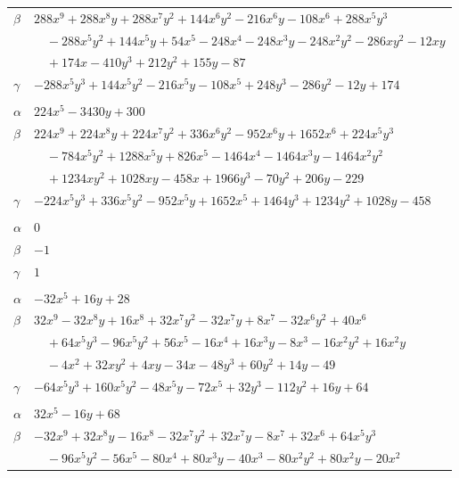 \documentclass[11pt]{article}
\begin{document}
\begin{longtable}{@{}ll@{}}
$\beta$ & $288x^{9}+288x^{8}y+288x^{7}y^{2}+144x^{6}y^{2}-216x^{6}y-108x^{6}+288x^{5}y^{3}$\\
 & $\quad -288x^{5}y^{2}+144x^{5}y+54x^{5}-248x^{4}-248x^{3}y-248x^{2}y^{2}-286xy^{2}-12xy$\\
 & $\quad +174x-410y^{3}+212y^{2}+155y-87$\\
$\gamma$ & $-288x^{5}y^{3}+144x^{5}y^{2}-216x^{5}y-108x^{5}+248y^{3}-286y^{2}-12y+174$\\
\addlinespace[3pt]
\multicolumn{2}{@{}l}{$\{i,j\}=\{8,34\}$, $k_{ij}=2^{3}\cdot 7\cdot 11$}\\
$\alpha$ & $224x^{5}-3430y+300$\\
$\beta$ & $224x^{9}+224x^{8}y+224x^{7}y^{2}+336x^{6}y^{2}-952x^{6}y+1652x^{6}+224x^{5}y^{3}$\\
 & $\quad -784x^{5}y^{2}+1288x^{5}y+826x^{5}-1464x^{4}-1464x^{3}y-1464x^{2}y^{2}$\\
 & $\quad +1234xy^{2}+1028xy-458x+1966y^{3}-70y^{2}+206y-229$\\
$\gamma$ & $-224x^{5}y^{3}+336x^{5}y^{2}-952x^{5}y+1652x^{5}+1464y^{3}+1234y^{2}+1028y-458$\\
\addlinespace[3pt]
\multicolumn{2}{@{}l}{$\{i,j\}=\{9,13\}$, $k_{ij}=3$}\\
$\alpha$ & $0$\\
$\beta$ & $-1$\\
$\gamma$ & $1$\\
\addlinespace[3pt]
\multicolumn{2}{@{}l}{$\{i,j\}=\{9,17\}$, $k_{ij}=3\cdot 7$}\\
$\alpha$ & $-32x^{5}+16y+28$\\
$\beta$ & $32x^{9}-32x^{8}y+16x^{8}+32x^{7}y^{2}-32x^{7}y+8x^{7}-32x^{6}y^{2}+40x^{6}$\\
 & $\quad +64x^{5}y^{3}-96x^{5}y^{2}+56x^{5}-16x^{4}+16x^{3}y-8x^{3}-16x^{2}y^{2}+16x^{2}y$\\
 & $\quad -4x^{2}+32xy^{2}+4xy-34x-48y^{3}+60y^{2}+14y-49$\\
$\gamma$ & $-64x^{5}y^{3}+160x^{5}y^{2}-48x^{5}y-72x^{5}+32y^{3}-112y^{2}+16y+64$\\
\addlinespace[3pt]
\multicolumn{2}{@{}l}{$\{i,j\}=\{9,20\}$, $k_{ij}=3^{3}$}\\
$\alpha$ & $32x^{5}-16y+68$\\
$\beta$ & $-32x^{9}+32x^{8}y-16x^{8}-32x^{7}y^{2}+32x^{7}y-8x^{7}+32x^{6}+64x^{5}y^{3}$\\
 & $\quad -96x^{5}y^{2}-56x^{5}-80x^{4}+80x^{3}y-40x^{3}-80x^{2}y^{2}+80x^{2}y-20x^{2}$\\

\end{longtable}
\end{document}
